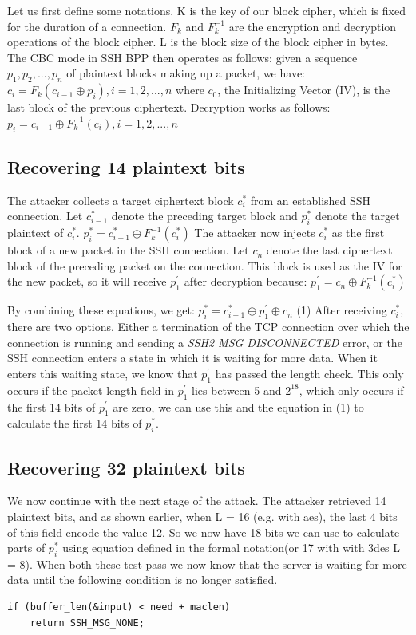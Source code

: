 \documentclass[twocolumn]{article}
\begin{document}
\indent Let us first define some notations. K is the key of our block cipher, which is fixed for the duration of a connection. $F_k$ and $F^{-1}_k$ are the encryption and decryption operations of the block cipher. L is the block size of the block cipher in bytes. The CBC mode in SSH BPP then operates as follows: given a sequence $p_1,p_2,...,p_n$ of plaintext blocks making up a packet, we have: 
$c_i = F_k(c_{i-1} \oplus p_i), i = 1,2,...,n$
where $c_0$, the Initializing Vector (IV), is the last block of the previous ciphertext. Decryption works as follows: $p_i = c_{i-1} \oplus F^{-1}_k(c_i), i = 1,2,...,n$

\subsection*{Recovering 14 plaintext bits}

\indent The attacker collects a target ciphertext block $c_i^*$ from an established SSH connection. Let $c_{i-1}^*$ denote the preceding target block and $p_i^*$ denote the target plaintext of $c_i^*$.
$p_i^* = c_{i-1}^* \oplus F^{-1}_k(c_i^*)$
The attacker now injects $c_i^*$ as the first block of a new packet in the SSH connection. Let $c_n$ denote the last ciphertext block of the preceding packet on the connection. This block is used as the IV for the new packet, so it will receive $p^{'}_1$ after decryption because: $p^{'}_1 = c_n \oplus F^{-1}_k(c_i^*)$

\indent By combining these equations, we get: $p_i^* = c_{i-1}^* \oplus p^{'}_1 \oplus c_n$ (1)
After receiving $c_i^*$, there are two options. Either a termination of the TCP connection over which the connection is running and sending a \textit{SSH2 MSG DISCONNECTED} error, or the SSH connection enters a state in which it is waiting for more data. When it enters this waiting state, we know that $p^{'}_1$ has passed the length check. This only occurs if the packet length field in $p^{'}_1$ lies between 5 and $2^{18}$, which only occurs if the first 14 bits of $p^{'}_1$ are zero, we can use this and the equation in (1) to calculate the first 14 bits of $p_i^*$. 

\subsection*{Recovering 32 plaintext bits}
\indent We now continue with the next stage of the attack. The attacker retrieved 14 plaintext bits, and as shown earlier, when L = 16 (e.g. with aes), the last 4 bits of this field encode the value 12. So we now have 18 bits we can use to calculate parts of $p^*_i$ using equation defined in the formal notation(or 17 with with 3des L = 8). When both these test pass we now know that the server is waiting for more data until the following condition is no longer satisfied.
\begin{verbatim}
if (buffer_len(&input) < need + maclen)
	return SSH_MSG_NONE;
\end{verbatim}
\end{document}
